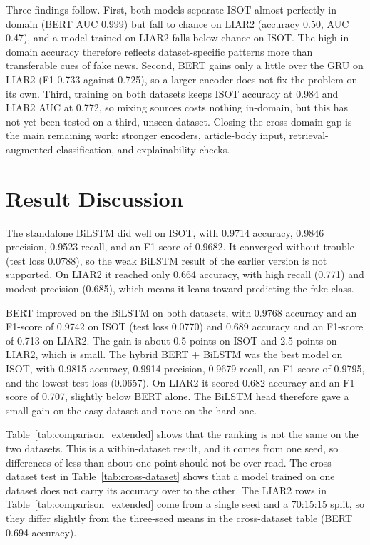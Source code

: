 Three findings follow. First, both models separate ISOT almost perfectly in-domain (BERT AUC 0.999) but fall to chance on LIAR2 (accuracy 0.50, AUC 0.47), and a model trained on LIAR2 falls below chance on ISOT. The high in-domain accuracy therefore reflects dataset-specific patterns more than transferable cues of fake news. Second, BERT gains only a little over the GRU on LIAR2 (F1 0.733 against 0.725), so a larger encoder does not fix the problem on its own. Third, training on both datasets keeps ISOT accuracy at 0.984 and LIAR2 AUC at 0.772, so mixing sources costs nothing in-domain, but this has not yet been tested on a third, unseen dataset. Closing the cross-domain gap is the main remaining work: stronger encoders, article-body input, retrieval-augmented classification, and explainability checks.

\section{Result Discussion}

The standalone BiLSTM did well on ISOT, with 0.9714 accuracy, 0.9846 precision, 0.9523 recall, and an F1-score of 0.9682. It converged without trouble (test loss 0.0788), so the weak BiLSTM result of the earlier version is not supported. On LIAR2 it reached only 0.664 accuracy, with high recall (0.771) and modest precision (0.685), which means it leans toward predicting the fake class.

BERT improved on the BiLSTM on both datasets, with 0.9768 accuracy and an F1-score of 0.9742 on ISOT (test loss 0.0770) and 0.689 accuracy and an F1-score of 0.713 on LIAR2. The gain is about 0.5 points on ISOT and 2.5 points on LIAR2, which is small. The hybrid BERT + BiLSTM was the best model on ISOT, with 0.9815 accuracy, 0.9914 precision, 0.9679 recall, an F1-score of 0.9795, and the lowest test loss (0.0657). On LIAR2 it scored 0.682 accuracy and an F1-score of 0.707, slightly below BERT alone. The BiLSTM head therefore gave a small gain on the easy dataset and none on the hard one.

Table~\ref{tab:comparison_extended} shows that the ranking is not the same on the two datasets. This is a within-dataset result, and it comes from one seed, so differences of less than about one point should not be over-read. The cross-dataset test in Table~\ref{tab:cross-dataset} shows that a model trained on one dataset does not carry its accuracy over to the other. The LIAR2 rows in Table~\ref{tab:comparison_extended} come from a single seed and a 70:15:15 split, so they differ slightly from the three-seed means in the cross-dataset table (BERT 0.694 accuracy).

